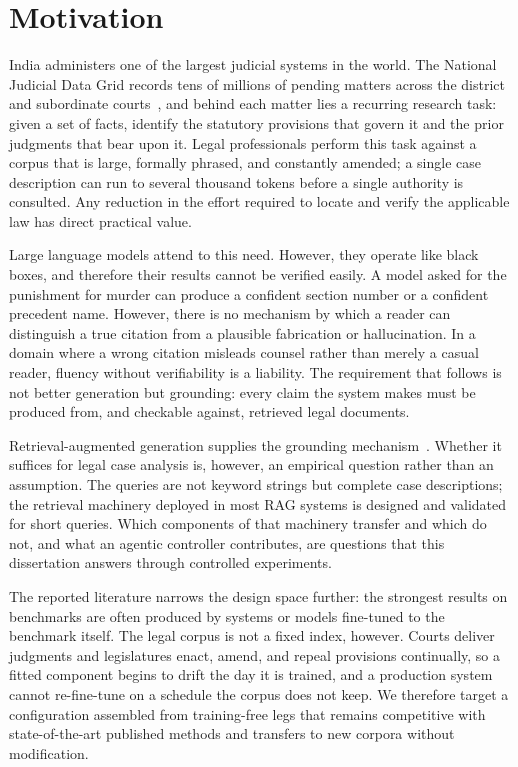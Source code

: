 \documentclass{mnnit}
\begin{document}
\section{Motivation}
India administers one of the largest judicial systems in the
world. The National Judicial Data Grid records tens of millions
of pending matters across the district and subordinate
courts~\cite{njdg}, and behind each matter lies a recurring
research task: given a set of facts, identify the statutory
provisions that govern it and the prior judgments that bear upon
it. Legal professionals perform this task against a corpus that
is large, formally phrased, and constantly amended; a single case
description can run to several thousand tokens before a single
authority is consulted. Any reduction in the effort required to
locate and verify the applicable law has direct practical value.

Large language models attend to this need. However, they operate
like black boxes, and therefore their results cannot be verified
easily. A model asked for the punishment for murder can produce
a confident section number or a confident precedent name.
However, there is no mechanism by which a reader can distinguish
a true citation from a plausible fabrication or hallucination. In
a domain where a wrong citation misleads counsel rather than
merely a casual reader, fluency without verifiability is a
liability. The requirement that follows is not better generation
but grounding: every claim the system makes must be produced
from, and checkable against, retrieved legal documents.

Retrieval-augmented generation supplies the grounding
mechanism~\cite{rag}. Whether it suffices for legal case
analysis is, however, an empirical question rather than an
assumption. The queries are not keyword strings but complete
case descriptions; the retrieval machinery deployed in most RAG
systems is designed and validated for short queries. Which
components of that machinery transfer and which do not, and what
an agentic controller contributes, are questions that this
dissertation answers through controlled experiments.

The reported literature narrows the design space further: the
strongest results on benchmarks are often produced by systems or
models fine-tuned to the benchmark itself. The legal corpus is
not a fixed index, however. Courts deliver judgments and
legislatures enact, amend, and repeal provisions continually, so
a fitted component begins to drift the day it is trained, and a
production system cannot re-fine-tune on a schedule the corpus
does not keep. We therefore target a configuration assembled
from training-free legs that remains competitive with
state-of-the-art published methods and transfers to new corpora
without modification.
\end{document}
